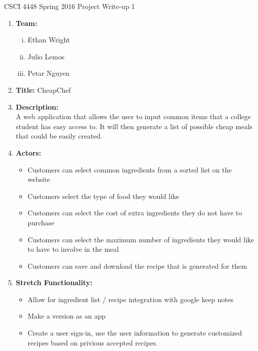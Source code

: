 \documentclass[12pt]{article}
\begin{document}
CSCI 4448 Spring 2016 \hfill Project Write-up 1\\

\hrulefill
\begin{enumerate}
\item\textbf{Team: }
\begin{enumerate}[i.]
\item Ethan Wright
\item Julio Lemos
\item Petar Nguyen
\end{enumerate}
\hrulefill
\item\textbf{Title:} 
CheapChef  \\

\hrulefill
\item\textbf{Description: } \\
A web application that allows the user to input common items that a college student has easy
access to. It will then generate a list of possible cheap meals that could be easily created. \\
\hrulefill
\item\textbf{Actors: } \\
\begin{itemize}
\item Customers can select common ingredients from a sorted list on the website
\item Customers select the type of food they would like
\item Customers can select the cost of extra ingredients they do not have to purchase
\item Customers can select the maximum number of ingredients they would like to have to involve in the meal
\item Customers can save and download the recipe that is generated for them
\end{itemize}
\hrulefill
\newpage
\item\textbf{Stretch Functionality: } \\
\begin{itemize}
\item Allow for ingredient list / recipe integration with google keep notes
\item Make a version as an app
\item Create a user sign-in, use the user information to generate customized recipes based on privious accepted recipes. 
\end{itemize}


\end{enumerate}
\end{document}

